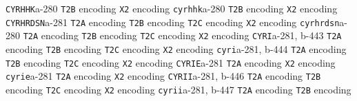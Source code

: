 \documentclass[twoside]{ltxdoc}
\makeatletter
\renewenvironment{theindex}{%
   \@restonecoltrue
   \if@twocolumn\@restonecolfalse\fi
   \columnseprule \z@
   \columnsep 35\p@
   \twocolumn[\index@prologue]%
   \IndexParms
   \let\item\@idxitem
   \ignorespaces
}{\if@restonecol\onecolumn\else\clearpage\fi}
\makeatother
\begin{document}
\begin{theindex}
  \item \texttt  {CYRHHK}\pfill a-280
    \subitem \texttt  {T2B} encoding\pfill {}
    \subitem \texttt  {X2} encoding\pfill {}
  \item \texttt  {cyrhhk}\pfill a-280
    \subitem \texttt  {T2B} encoding\pfill {}
    \subitem \texttt  {X2} encoding\pfill {}
  \item \texttt  {CYRHRDSN}\pfill a-281
    \subitem \texttt  {T2A} encoding\pfill {}
    \subitem \texttt  {T2B} encoding\pfill {}
    \subitem \texttt  {T2C} encoding\pfill {}
    \subitem \texttt  {X2} encoding\pfill {}
  \item \texttt  {cyrhrdsn}\pfill a-280
    \subitem \texttt  {T2A} encoding\pfill {}
    \subitem \texttt  {T2B} encoding\pfill {}
    \subitem \texttt  {T2C} encoding\pfill {}
    \subitem \texttt  {X2} encoding\pfill {}
  \item \texttt  {CYRI}\pfill a-281, b-443
    \subitem \texttt  {T2A} encoding\pfill {}
    \subitem \texttt  {T2B} encoding\pfill {}
    \subitem \texttt  {T2C} encoding\pfill {}
    \subitem \texttt  {X2} encoding\pfill {}
  \item \texttt  {cyri}\pfill a-281, b-444
    \subitem \texttt  {T2A} encoding\pfill {}
    \subitem \texttt  {T2B} encoding\pfill {}
    \subitem \texttt  {T2C} encoding\pfill {}
    \subitem \texttt  {X2} encoding\pfill {}
  \item \texttt  {CYRIE}\pfill a-281
    \subitem \texttt  {T2A} encoding\pfill {}
    \subitem \texttt  {X2} encoding\pfill {}
  \item \texttt  {cyrie}\pfill a-281
    \subitem \texttt  {T2A} encoding\pfill {}
    \subitem \texttt  {X2} encoding\pfill {}
  \item \texttt  {CYRII}\pfill a-281, b-446
    \subitem \texttt  {T2A} encoding\pfill {}
    \subitem \texttt  {T2B} encoding\pfill {}
    \subitem \texttt  {T2C} encoding\pfill {}
    \subitem \texttt  {X2} encoding\pfill {}
  \item \texttt  {cyrii}\pfill a-281, b-447
    \subitem \texttt  {T2A} encoding\pfill {}
    \subitem \texttt  {T2B} encoding\pfill {}

\end{theindex}
\end{document}
